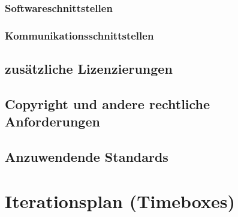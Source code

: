 \documentclass[a4paper,12pt,twoside]{scrreprt}
\begin{document}
    \subsection{Softwareschnittstellen}
        
    \subsection{Kommunikationsschnittstellen}
        
    \section{zusätzliche Lizenzierungen}
        
    \section{Copyright und andere rechtliche Anforderungen}
        
    \section{Anzuwendende Standards}
        

    \chapter{Iterationsplan (Timeboxes)}
\end{document}
